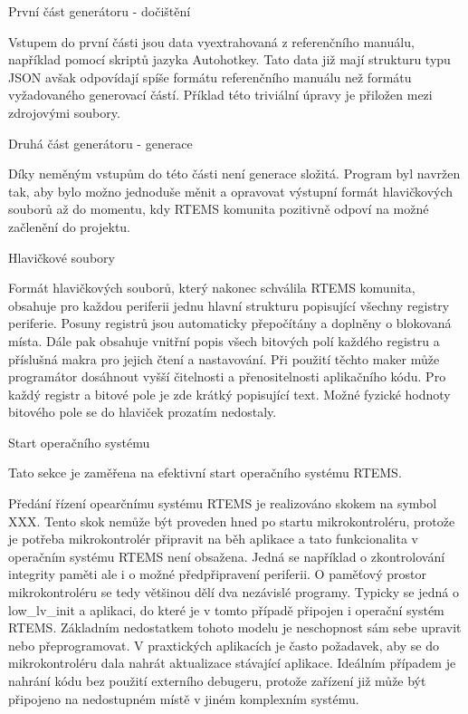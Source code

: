 \secc První část generátoru - dočištění

	Vstupem do první části jsou data vyextrahovaná z referenčního manuálu, například pomocí skriptů jazyka Autohotkey.
Tato data již mají strukturu typu JSON avšak odpovídají spíše formátu referenčního manuálu než formátu vyžadovaného generovací částí.
Příklad této triviální úpravy je přiložen mezi zdrojovými soubory.

\secc Druhá část generátoru - generace

	Díky neměným vstupům do této části není generace složitá.
Program byl navržen tak, aby bylo možno jednoduše měnit a opravovat výstupní formát hlavičkových souborů až do momentu, kdy RTEMS komunita pozitivně odpoví na možné začlenění do projektu.

\secc Hlavičkové soubory

	Formát hlavičkových souborů, který nakonec schválila RTEMS komunita, obsahuje pro každou periferii jednu hlavní strukturu popisující všechny registry periferie.
Posuny registrů jsou automaticky přepočítány a doplněny o blokovaná místa.
Dále pak obsahuje vnitřní popis všech bitových polí každého registru a příslušná makra pro jejich čtení a nastavování.
Při použití těchto maker může programátor dosáhnout vyšší čitelnosti a přenositelnosti aplikačního kódu.
Pro každý registr a bitové pole je zde krátký popisující text.
Možné fyzické hodnoty bitového pole se do hlaviček prozatím nedostaly.

\sec Start operačního systému

	Tato sekce je zaměřena na efektivní start operačního systému RTEMS.

	Předání řízení opearčnímu systému RTEMS je realizováno skokem na symbol XXX.
Tento skok nemůže být proveden hned po startu mikrokontroléru, protože je potřeba mikrokontrolér připravit na běh aplikace a tato funkcionalita v operačním systému RTEMS není obsažena.
Jedná se například o zkontrolování integrity paměti ale i o možné předpřipravení periferii.
O paměťový prostor mikrokontroléru se tedy většinou dělí dva nezávislé programy.
Typicky se jedná o low\_lv\_init a aplikaci, do které je v tomto případě připojen i operační systém RTEMS.
Základním nedostatkem tohoto modelu je neschopnost sám sebe upravit nebo přeprogramovat.
V praxtických aplikacích je často požadavek, aby se do mikrokontroléru dala nahrát aktualizace stávající aplikace.
Ideálním případem je nahrání kódu bez použití externího debugeru, protože zařízení již může být připojeno na nedostupném místě v jiném komplexním systému.

